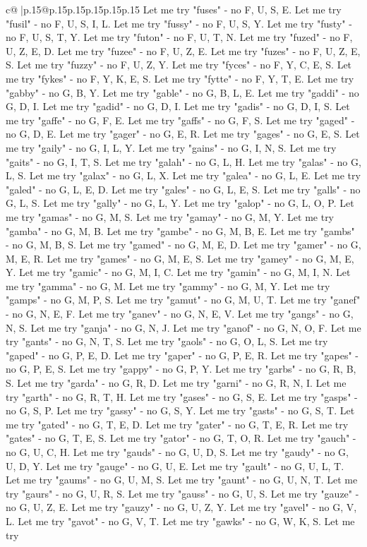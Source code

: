 \documentclass{article}
\begin{document}
{\begin{supertabular}{c@{$\;$}|p{.15\linewidth}@{}p{.15\linewidth}p{.15\linewidth}p{.15\linewidth}p{.15\linewidth}p{.15\linewidth}}
{{{Let me try "fuses" {-} no F, U, S, E. Let me try "fusil" {-} no F, U, S, I, L. Let me try "fussy" {-} no F, U, S, Y. Let me try "fusty" {-} no F, U, S, T, Y. Let me try "futon" {-} no F, U, T, N. Let me try "fuzed" {-} no F, U, Z, E, D. Let me try "fuzee" {-} no F, U, Z, E. Let me try "fuzes" {-} no F, U, Z, E, S. Let me try "fuzzy" {-} no F, U, Z, Y. Let me try "fyces" {-} no F, Y, C, E, S. Let me try "fykes" {-} no F, Y, K, E, S. Let me try "fytte" {-} no F, Y, T, E. Let me try "gabby" {-} no G, B, Y. Let me try "gable" {-} no G, B, L, E. Let me try "gaddi" {-} no G, D, I. Let me try "gadid" {-} no G, D, I. Let me try "gadis" {-} no G, D, I, S. Let me try "gaffe" {-} no G, F, E. Let me try "gaffs" {-} no G, F, S. Let me try "gaged" {-} no G, D, E. Let me try "gager" {-} no G, E, R. Let me try "gages" {-} no G, E, S. Let me try "gaily" {-} no G, I, L, Y. Let me try "gains" {-} no G, I, N, S. Let me try "gaits" {-} no G, I, T, S. Let me try "galah" {-} no G, L, H. Let me try "galas" {-} no G, L, S. Let me try "galax" {-} no G, L, X. Let me try "galea" {-} no G, L, E. Let me try "galed" {-} no G, L, E, D. Let me try "gales" {-} no G, L, E, S. Let me try "galls" {-} no G, L, S. Let me try "gally" {-} no G, L, Y. Let me try "galop" {-} no G, L, O, P. Let me try "gamas" {-} no G, M, S. Let me try "gamay" {-} no G, M, Y. Let me try "gamba" {-} no G, M, B. Let me try "gambe" {-} no G, M, B, E. Let me try "gambs" {-} no G, M, B, S. Let me try "gamed" {-} no G, M, E, D. Let me try "gamer" {-} no G, M, E, R. Let me try "games" {-} no G, M, E, S. Let me try "gamey" {-} no G, M, E, Y. Let me try "gamic" {-} no G, M, I, C. Let me try "gamin" {-} no G, M, I, N. Let me try "gamma" {-} no G, M. Let me try "gammy" {-} no G, M, Y. Let me try "gamps" {-} no G, M, P, S. Let me try "gamut" {-} no G, M, U, T. Let me try "ganef" {-} no G, N, E, F. Let me try "ganev" {-} no G, N, E, V. Let me try "gangs" {-} no G, N, S. Let me try "ganja" {-} no G, N, J. Let me try "ganof" {-} no G, N, O, F. Let me try "gants" {-} no G, N, T, S. Let me try "gaols" {-} no G, O, L, S. Let me try "gaped" {-} no G, P, E, D. Let me try "gaper" {-} no G, P, E, R. Let me try "gapes" {-} no G, P, E, S. Let me try "gappy" {-} no G, P, Y. Let me try "garbs" {-} no G, R, B, S. Let me try "garda" {-} no G, R, D. Let me try "garni" {-} no G, R, N, I. Let me try "garth" {-} no G, R, T, H. Let me try "gases" {-} no G, S, E. Let me try "gasps" {-} no G, S, P. Let me try "gassy" {-} no G, S, Y. Let me try "gasts" {-} no G, S, T. Let me try "gated" {-} no G, T, E, D. Let me try "gater" {-} no G, T, E, R. Let me try "gates" {-} no G, T, E, S. Let me try "gator" {-} no G, T, O, R. Let me try "gauch" {-} no G, U, C, H. Let me try "gauds" {-} no G, U, D, S. Let me try "gaudy" {-} no G, U, D, Y. Let me try "gauge" {-} no G, U, E. Let me try "gault" {-} no G, U, L, T. Let me try "gaums" {-} no G, U, M, S. Let me try "gaunt" {-} no G, U, N, T. Let me try "gaurs" {-} no G, U, R, S. Let me try "gauss" {-} no G, U, S. Let me try "gauze" {-} no G, U, Z, E. Let me try "gauzy" {-} no G, U, Z, Y. Let me try "gavel" {-} no G, V, L. Let me try "gavot" {-} no G, V, T. Let me try "gawks" {-} no G, W, K, S. Let me try }}}
\end{supertabular}}
\end{document}
